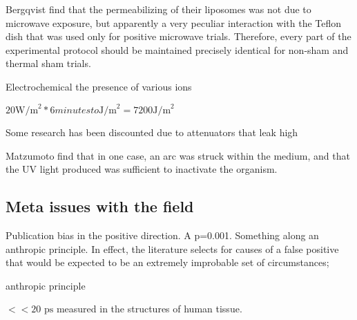 \documentclass[paper.tex]{subfiles}
\begin{document}
\begin{multicols}{1}
Bergqvist \cite{Effect1994a} find that the permeabilizing of their liposomes was not due to microwave exposure, but apparently a very peculiar interaction with the Teflon dish that was used only for positive microwave trials. Therefore, every part of the experimental protocol should be maintained precisely identical for non-sham and thermal sham trials.

Electrochemical the presence of various ions 



$20 \text{W/m}^2 * 6 minutes to \text{J/m}^2 = 7200 \text{J/m}^2$


Some research has been discounted due to attenuators that leak high 

Matzumoto \cite{Inactivation1991} find that in one case, an arc was struck within the medium, and that the UV light produced was sufficient to inactivate the organism.





\subsection{Meta issues with the field}


Publication bias in the positive direction. A p=0.001. Something along an anthropic principle. In effect, the literature selects for causes of a false positive that would be expected to be an extremely improbable set of circumstances; 

anthropic principle



 $<< 20 \text{ ps}$ \footnotemark measured in the structures of human tissue.\\
 

\end{multicols}
\end{document}
